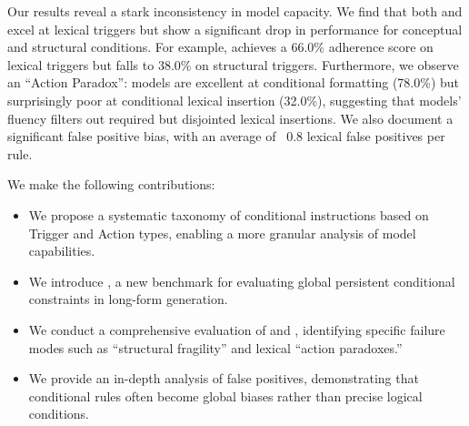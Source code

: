 Our results reveal a stark inconsistency in model capacity. We find that both \gptlarge and \gptmini excel at lexical triggers but show a significant drop in performance for conceptual and structural conditions. For example, \gptlarge achieves a 66.0\% adherence score on lexical triggers but falls to 38.0\% on structural triggers. Furthermore, we observe an ``Action Paradox'': models are excellent at conditional formatting (78.0\%) but surprisingly poor at conditional lexical insertion (32.0\%), suggesting that models' fluency filters out required but disjointed lexical insertions. We also document a significant false positive bias, with an average of ~0.8 lexical false positives per rule.

We make the following contributions:
\begin{itemize}[leftmargin=*,itemsep=0pt,topsep=0pt]
    \item We propose a systematic taxonomy of conditional instructions based on Trigger and Action types, enabling a more granular analysis of model capabilities.
    \item We introduce \benchmark, a new benchmark for evaluating global persistent conditional constraints in long-form generation.
    \item We conduct a comprehensive evaluation of \gptlarge and \gptmini, identifying specific failure modes such as ``structural fragility'' and lexical ``action paradoxes.''
    \item We provide an in-depth analysis of false positives, demonstrating that conditional rules often become global biases rather than precise logical conditions.
\end{itemize}
